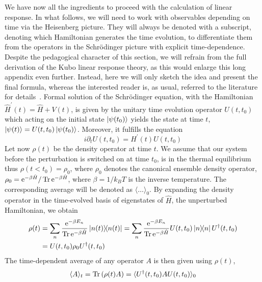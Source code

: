We have now all the ingredients to proceed with the calculation of linear response.
In what follows, we will need to work with observables depending on time via the Heisenberg picture. They will always be
denoted with a subscript, denoting which Hamiltonian generates the time evolution,
to differentiate them from the operators in the Schrödinger picture with explicit time-dependence.
Despite the pedagogical character of this section, we will
refrain from the full derivation of the Kubo linear response theory, as this would enlarge this long
appendix even further. Instead, here we will only sketch the idea and present the final formula,
whereas the interested reader is, as usual, referred to the literature for details~\autocite{Mahan2000,Pottier2014,Gohmann2021}.
Formal solution of the Schrödinger equation, with the Hamiltonian \(\hat{H} ^{\prime}(t) = \hat{H}  + V(t)\), is given
by the unitary time evolution operator \(U(t,t_{0})\) which acting on the initial state \(\ket{\psi
    (t_{0})}\) yields the state at time \(t\), \(\ket{\psi (t)} = U(t,t_{0}) \ket{\psi (t_{0})}\).
Moreover, it fulfills the equation
\begin{equation}
    i \partial_t U(t,t_{0}) = H^{\prime}(t) U(t,t_{0})
    \label{eq:time_evolution_operator}
\end{equation}
Let now \(\rho (t)\) be the density operator at time \(t\).
We assume that our system before the perturbation is switched on at time \(t_0\), is in the thermal equilibrium
thus \(\rho (t<t_0 ) = \rho_0\), where \(\rho_0\) denotes the canonical ensemble density operator,
\( \rho_0 = \mathrm{e}^{-\beta \hat{H} } / \Tr \mathrm{e}^{-\beta
    \hat{H} }\), where \(\beta = 1 / k_B T\) is the inverse temperature. The corresponding average will be
denoted as \(\langle \dots  \rangle_0 \). By expanding the density operator in the time-evolved basis
of eigenstates of \(\hat{H} \), the unperturbed Hamiltonian, we obtain
\begin{align}
    \rho (t) & = \sum_{n} \frac{\mathrm{e}^{-\beta E_n} }{\Tr \mathrm{e}^{-\beta \hat{H} }} \ketbra{n(t)}{n(t)} = \sum_n \frac{\mathrm{e}^{-\beta E_n}}{\Tr \mathrm{e}^{-\beta \hat{H} }} U(t,t_0) \ketbra{n}{n} U^{\dag}(t,t_0)\nonumber \\
             & = U(t,t_0) \rho_0 U^{\dag}(t,t_0)
\end{align}
The time-dependent average of any operator \(A\) is then
given using \(\rho (t)\),
\begin{equation}
    \langle A \rangle_t = \Tr \left( \rho (t) A \right) = \langle U^{\dag}(t,t_0)  A  U(t,t_0)\rangle_0
\end{equation}
